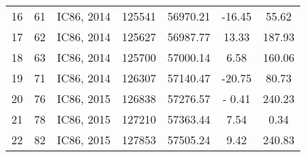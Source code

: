 \begin{table}[htbp]
\begin{tabular}{
    S[table-format =  2.0]
    S[table-format =  2.0]
    l
    S[table-format =  6.0]
    S[table-format =  5.2]
    S[table-format = -2.2]
    S[table-format =  3.2]
  }
  16 & 61 & IC86, 2014 & 125541 & 56970.21 & -16.45 &  55.62 \\
  17 & 62 & IC86, 2014 & 125627 & 56987.77 &  13.33 & 187.93 \\
  18 & 63 & IC86, 2014 & 125700 & 57000.14 &   6.58 & 160.06 \\
  19 & 71 & IC86, 2014 & 126307 & 57140.47 & -20.75 &  80.73 \\
  20 & 76 & IC86, 2015 & 126838 & 57276.57 & - 0.41 & 240.23 \\
  21 & 78 & IC86, 2015 & 127210 & 57363.44 &   7.54 &   0.34 \\
  22 & 82 & IC86, 2015 & 127853 & 57505.24 &   9.42 & 240.83 \\
  \bottomrule
\end{tabular}
\end{table}


